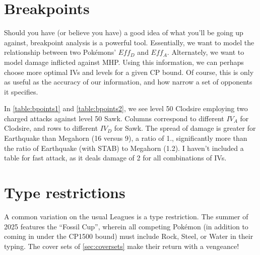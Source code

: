 \section{Breakpoints\label{sec:breakpoints}}
Should you have (or believe you have) a good idea of what you'll be going up against,
 breakpoint analysis is a powerful tool.
Essentially, we want to model the relationship between two Pokémons' $Eff_D$
 and $Eff_A$.
Alternately, we want to model damage inflicted against MHP\@.
Using this information, we can perhaps choose more optimal IVs and levels for a given CP bound.
Of course, this is only as useful as the accuracy of our information, and how narrow a set of opponents it specifies.

In \autoref{table:bpoints1} and \autoref{table:bpoints2}, we see level 50 Clodsire
  employing two charged attacks against level 50 Sawk.
Columns correspond to different $IV_A$ for Clodsire, and rows to different $IV_D$ for Sawk.
The spread of damage is greater for Earthquake than Megahorn (16 versus 9), a ratio
  of 1., significantly more than the ratio of Earthquake (with STAB)
  to Megahorn (1.2).
I haven't included a table for fast attack, as it deals damage of 2 for all combinations of IVs.



\section{Type restrictions\label{sec:typeleagues}}
A common variation on the usual Leagues is a type restriction.
The summer of 2025 features the ``Fossil Cup'', wherein all competing
  Pokémon (in addition to coming in under the CP1500 bound)
  must include Rock, Steel, or Water in their typing.
The cover sets of \autoref{sec:coversets} make their return with a vengeance!

